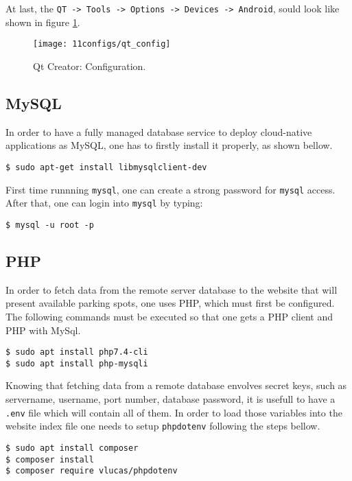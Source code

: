 At last, the \verb|QT -> Tools -> Options -> Devices -> Android|, sould look like shown in figure \ref{fig:qt_config}.

\begin{figure}[H]
	\centering	
	\texttt{[image: 11configs/qt\_config]}
	\caption{Qt Creator: Configuration.}
	\label{fig:qt_config}
\end{figure}

\subsection{MySQL}
In order to have a fully managed database service to deploy cloud-native applications as MySQL, one has to firstly install it properly, as shown bellow.

\begin{lstlisting}
$ sudo apt-get install libmysqlclient-dev
\end{lstlisting}

First time runnning \verb|mysql|, one can create a strong password for \verb|mysql| access. After that, one can login into \verb|mysql| by typing:

\begin{lstlisting}
$ mysql -u root -p
\end{lstlisting}

\subsection{PHP}
In order to fetch data from the remote server database to the website that will present available parking spots, one uses PHP, which must first be configured. The following commands must be executed so that one gets a PHP client and PHP with MySql.

\begin{lstlisting}
$ sudo apt install php7.4-cli
$ sudo apt install php-mysqli
\end{lstlisting}

Knowing that fetching data from a remote database envolves secret keys, such as servername, username, port number, database password, it is usefull to have a \verb|.env| file which will contain all of them. In order to load those variables into the website index file one needs to setup \verb|phpdotenv| following the steps bellow. \cite{phpdotenv}

\begin{lstlisting}
$ sudo apt install composer
$ composer install
$ composer require vlucas/phpdotenv
\end{lstlisting}

